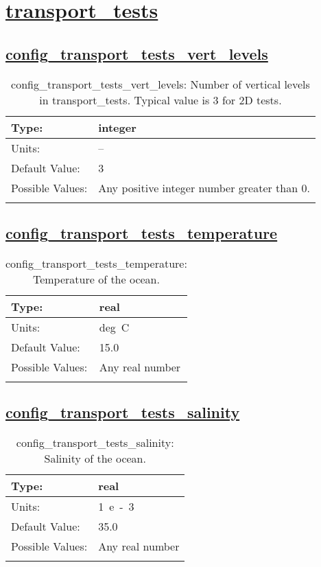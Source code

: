 \section[transport\_tests]{\hyperref[sec:nm_tab_transport_tests]{transport\_tests}}
\label{sec:nm_sec_transport_tests}
\subsection[config\_transport\_tests\_vert\_levels]{\hyperref[sec:nm_tab_transport_tests]{config\_transport\_tests\_vert\_levels}}
\label{subsec:nm_sec_config_transport_tests_vert_levels}
\begin{center}
\begin{longtable}{| p{2.0in} || p{4.0in} |}
    \hline
    Type: & integer \\
    \hline
    Units: & -- \\
    \hline
    Default Value: & 3 \\
    \hline
    Possible Values: & Any positive integer number greater than 0. \\
    \hline
    \caption{config\_transport\_tests\_vert\_levels: Number of vertical levels in transport\_tests. Typical value is 3 for 2D tests.}
\end{longtable}
\end{center}
\subsection[config\_transport\_tests\_temperature]{\hyperref[sec:nm_tab_transport_tests]{config\_transport\_tests\_temperature}}
\label{subsec:nm_sec_config_transport_tests_temperature}
\begin{center}
\begin{longtable}{| p{2.0in} || p{4.0in} |}
    \hline
    Type: & real \\
    \hline
    Units: & \si{deg.C} \\
    \hline
    Default Value: & 15.0 \\
    \hline
    Possible Values: & Any real number \\
    \hline
    \caption{config\_transport\_tests\_temperature: Temperature of the ocean.}
\end{longtable}
\end{center}
\subsection[config\_transport\_tests\_salinity]{\hyperref[sec:nm_tab_transport_tests]{config\_transport\_tests\_salinity}}
\label{subsec:nm_sec_config_transport_tests_salinity}
\begin{center}
\begin{longtable}{| p{2.0in} || p{4.0in} |}
    \hline
    Type: & real \\
    \hline
    Units: & \si{1.e-3} \\
    \hline
    Default Value: & 35.0 \\
    \hline
    Possible Values: & Any real number \\
    \hline
    \caption{config\_transport\_tests\_salinity: Salinity of the ocean.}
\end{longtable}
\end{center}

